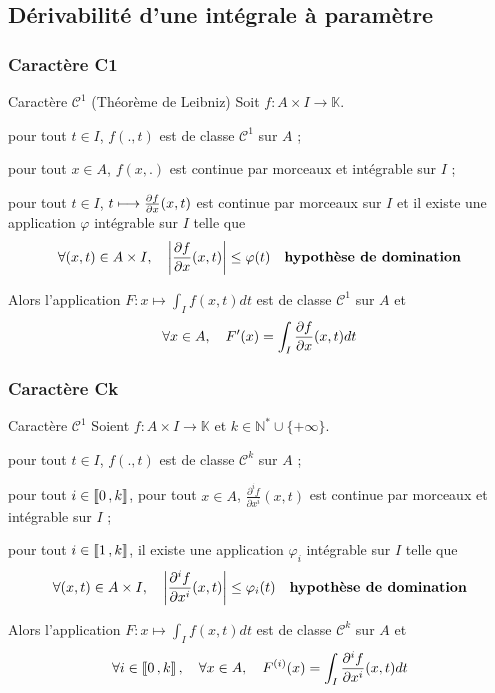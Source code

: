 \subsection{Dérivabilité d’une intégrale à paramètre}

    \subsubsection{Caractère C1}

    \begin{theo}{Caractère $\mathcal{C}^1$ (Théorème de Leibniz)}{}
        Soit $f : A \times I \to \mathbb{K}$. 
        \begin{suppose}
            \item pour tout $t \in I$, $f(.,t)$ est de classe $\mathcal{C}^1$ sur $A$ ;
            \item pour tout $x \in A$, $f(x,.)$ est continue par morceaux et intégrable sur $I$ ;
            \item pour tout $t \in I$, $t \longmapsto \frac{\partial f}{\partial x}(x,t)$ est continue par morceaux sur $I$ et il existe une application $\varphi$ intégrable sur $I$ telle que 
            \[ \forall (x,t) \in A \times I, \quad \left\lvert \frac{\partial f}{\partial x}(x,t)\right\rvert \leq \varphi(t) \quad \textbf{hypothèse de domination} \]
        \end{suppose}
        Alors l’application $F : x \longmapsto \int_I f(x,t) dt$ est de classe $\mathcal{C}^1$ sur $A$ et 
        \[ \forall x \in A, \quad F'(x) = \int_I \frac{\partial f}{\partial x}(x,t)dt \]
    \end{theo}

    \subsubsection{Caractère Ck}

    \begin{theo}{Caractère $\mathcal{C}^1$}{}
        Soient $f : A \times I \to \mathbb{K}$ et $k \in \mathbb{N}^* \cup \{ +\infty \}$.
        \begin{suppose}
            \item pour tout $t \in I$, $f(.,t)$ est de classe $\mathcal{C}^k$ sur $A$ ;
            \item pour tout $i \in \left\llbracket 0 \, , k \right\rrbracket$, pour tout $x \in A$, $\frac{\partial^i f}{\partial x^i}(x,t)$ est continue par morceaux et intégrable sur $I$ ;
            \item pour tout $i \in \left\llbracket 1 \, , k \right\rrbracket$, il existe une application $\varphi_i$ intégrable sur $I$ telle que 
            \[ \forall (x,t) \in A \times I, \quad \left\lvert \frac{\partial^i f}{\partial x^i}(x,t)\right\rvert \leq \varphi_i(t) \quad \textbf{hypothèse de domination} \]
        \end{suppose}
        Alors l’application $F : x \longmapsto \int_I f(x,t) dt$ est de classe $\mathcal{C}^k$ sur $A$ et 
        \[ \forall i \in \left\llbracket 0 \, , k \right\rrbracket, \quad \forall x \in A, \quad F^{(i)}(x) = \int_I \frac{\partial^i f}{\partial x^i}(x,t)dt \]
    \end{theo}

